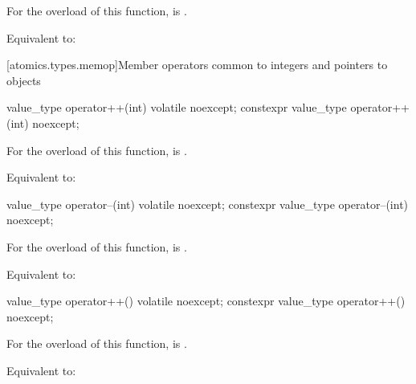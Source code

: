 \begin{itemdescr}
\pnum
\constraints
For the  overload of this function,
 is .

\pnum
\effects
Equivalent to: 
\end{itemdescr}

[atomics.types.memop]{Member operators common to integers and pointers to objects}

%
%
\begin{itemdecl}
value_type operator++(int) volatile noexcept;
constexpr value_type operator++(int) noexcept;
\end{itemdecl}

\begin{itemdescr}
\pnum
\constraints
For the  overload of this function,
 is .

\pnum
\effects
Equivalent to: 
\end{itemdescr}

%
%
\begin{itemdecl}
value_type operator--(int) volatile noexcept;
constexpr value_type operator--(int) noexcept;
\end{itemdecl}

\begin{itemdescr}
\pnum
\constraints
For the  overload of this function,
 is .

\pnum
\effects
Equivalent to: 
\end{itemdescr}

%
%
\begin{itemdecl}
value_type operator++() volatile noexcept;
constexpr value_type operator++() noexcept;
\end{itemdecl}

\begin{itemdescr}
\pnum
\constraints
For the  overload of this function,
 is .

\pnum
\effects
Equivalent to: 
\end{itemdescr}

